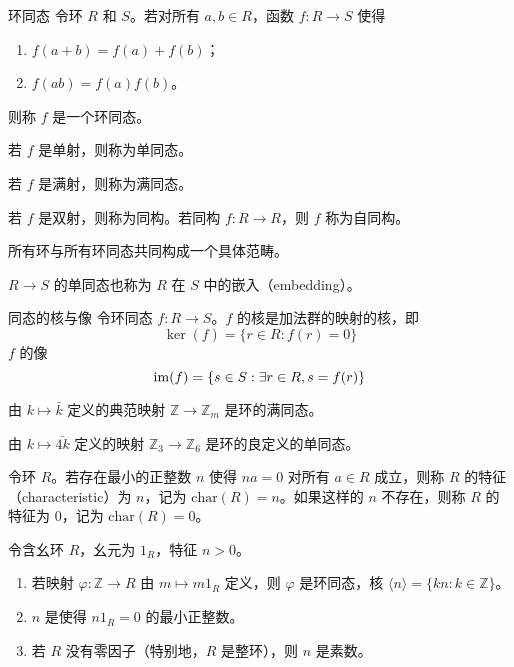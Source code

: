 \begin{definition}{环同态}
  令环 $R$ 和 $S$。若对所有 $a,b \in R$，函数 $f:R \to S$ 使得
  \begin{enumerate}
    \item $f(a + b) = f(a) + f(b)$；
    \item $f(ab) = f(a)f(b)$。
  \end{enumerate}
  则称 $f$ 是一个环同态。

  若 $f$ 是单射，则称为单同态。

  若 $f$ 是满射，则称为满同态。

  若 $f$ 是双射，则称为同构。若同构 $f:R \to R$，则 $f$ 称为自同构。
\end{definition}

\begin{remark}
  所有环与所有环同态共同构成一个具体范畴。
\end{remark}

\begin{remark}
  $R \to S$ 的单同态也称为 $R$ 在 $S$ 中的嵌入（embedding）。
\end{remark}

\begin{definition}{同态的核与像}
  令环同态 $f:R \to S$。$f$ 的核是加法群的映射的核，即 
  \[\ker(f) = \{ r \in R : f(r) = 0 \}\]
  $f$ 的像 
  \[\operatorname{im}(f) = \{ s \in S : \exists r \in R, s = f(r) \}\]
\end{definition}

\hfill

\begin{example}
  由 $k \mapsto \bar{k}$ 定义的典范映射 $\mathbb{Z} \to \mathbb{Z}_m$ 是环的满同态。
\end{example}

\hfill

\begin{example}
  由 $k \mapsto \bar{4k}$ 定义的映射 $\mathbb{Z}_3 \to \mathbb{Z}_6$ 是环的良定义的单同态。
\end{example}

\hfill

\begin{definition}
  令环 $R$。若存在最小的正整数 $n$ 使得 $na = 0$ 对所有 $a \in R$ 成立，则称 $R$ 的特征（characteristic）为 $n$，记为 $\text{char}(R) = n$。如果这样的 $n$ 不存在，则称 $R$ 的特征为 $0$，记为 $\text{char}(R) = 0$。
\end{definition}

\begin{theorem}
  令含幺环 $R$，幺元为 $1_R$，特征 $n > 0$。
  \begin{enumerate}
    \item 若映射 $\varphi : \mathbb{Z} \to R$ 由 $m \mapsto m1_R$ 定义，则 $\varphi$ 是环同态，核 $\langle n \rangle = \{ kn : k \in \mathbb{Z} \}$。
    \item $n$ 是使得 $n1_R = 0$ 的最小正整数。
    \item 若 $R$ 没有零因子（特别地，$R$ 是整环），则 $n$ 是素数。
  \end{enumerate}
\end{theorem}

